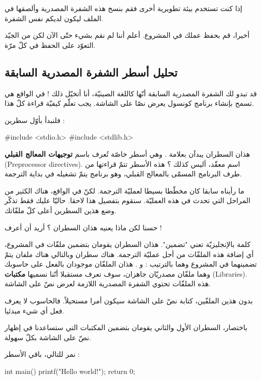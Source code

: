 إذا كنت تستخدم بيئة تطويرية أخرى فقم بنسخ هذه الشفرة المصدرية وألصقها في الملف  ليكون لديكم نفس الشفرة.

أخيرا، قم بحفظ عملك في المشروع. أعلم أننا لم نقم بشيء حتّى الآن لكن من الجيّد التعوّد على الحفظ في كلّ مرّة.

\subsection{تحليل أسطر الشفرة المصدرية السابقة}
قد تبدو لك الشفرة المصدرية السابقة أنّها كاللغة الصينيّة، أنا أتخيّل ذلك ! في الواقع هي تسمح بإنشاء برنامج كونسول يعرض نصّا على الشاشة. يجب تعلّم كيفيّة قراءة كلّ هذا.

فلنبدأ بأوّل سطرين :
\begin{Csource}
#include <stdio.h>
#include <stdlib.h>
\end{Csource}

هذان السطران يبدآن بعلامة
\InlineCode{\#}.
وهي أسطر خاصّة تُعرف باسم
\textbf{توجيهات المعالج القبلي}
(\textenglish{Preprocessor directives}). اسم معقّد، أليس كذلك ؟ هذه الأسطر تتمّ قراءتها من طرف البرنامج المسمّى بالمعالج القبلي، وهو برنامج يتمّ تشغيله في بداية الترجمة.

ما رأيناه سابقا كان مخطّطا بسيطا لعمليّة الترجمة. لكنّ في الواقع، هناك الكثير من المراحل التي تحدث في هذه العمليّة. سنقوم بتفصيل هذا لاحقا. حاليّا عليك فقط تذكّر وضع هذين السطرين أعلى كلّ ملفّاتك.

\begin{question}
  حسنا لكن ماذا يعنيه هذان السطران ؟ أريد أن أعرف !
\end{question}

كلمة
 بالإنجليزيّة تعني "تضمين". هذان السطران يقومان بتضمين ملفّات في المشروع، أي إضافة هذه الملفّات من أجل عمليّة الترجمة. هناك سطران وبالتالي هناك ملفان يتمّ تضمينهما في المشروع وهما بالترتيب :
 و
.
هذان الملفّان موجودان بالفعل على حاسوبك وهما ملفّان مصدريّان جاهزان، سوف تعرف مستقبلا أنّنا نسميها
\textbf{مكتبات}
(\textenglish{Libraries}).
 هذه الملفّات تحتوي الشفرة المصدرية اللازمة لعرض نصّ على الشاشة.

 بدون هذين الملفّين، كتابة نصّ على الشاشة سيكون أمرا مستحيلاً. فالحاسوب لا يعرف فعل أي شيء مبدئيا.

 باختصار، السطران الأول والثاني يقومان بتضمين المكتبات التي ستساعدنا في إظهار نصّ على الشاشة بكلّ سهولة.

 نمر للتالي، باقي الأسطر :
 
\begin{Csource}
int main()
{
    printf("Hello world!\n");
    return 0;
}
\end{Csource}

